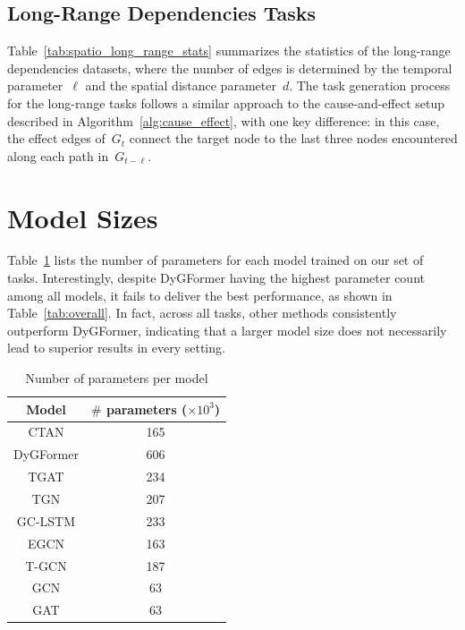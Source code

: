 \subsection{Long-Range Dependencies Tasks}
Table~\ref{tab:spatio_long_range_stats} summarizes the statistics of the long-range dependencies datasets, where the number of edges is determined by the temporal parameter~\( \ell \) and the spatial distance parameter~\( d \). The task generation process for the long-range tasks follows a similar approach to the cause-and-effect setup described in Algorithm~\ref{alg:cause_effect}, with one key difference: in this case, the effect edges of~\( G_t \) connect the target node to the last three nodes encountered along each path in~\( G_{t - \ell} \).

\section{Model Sizes}\label{appendix:parameters}
Table~\ref{tab:model_num_params} lists the number of parameters for each model trained on our set of tasks. Interestingly, despite DyGFormer having the highest parameter count among all models, it fails to deliver the best performance, as shown in Table~\ref{tab:overall}. In fact, across all tasks, other methods consistently outperform DyGFormer, indicating that a larger model size does not necessarily lead to superior results in every setting.
\begin{table}[t]

    \caption{Number of parameters per model}
    \label{tab:model_num_params}
    \centering
    \begin{tabular}{c|c}
        Model & $\#$ parameters ($\times 10^3$) \\
        \toprule
        CTAN & 165 \\
        DyGFormer & 606 \\
        TGAT & 234 \\
        TGN & 207 \\
        \midrule
        GC-LSTM & 233 \\
        EGCN & 163 \\
        T-GCN & 187 \\
        GCN & 63 \\
        GAT & 63 \\
        \bottomrule
    \end{tabular}
\end{table}


